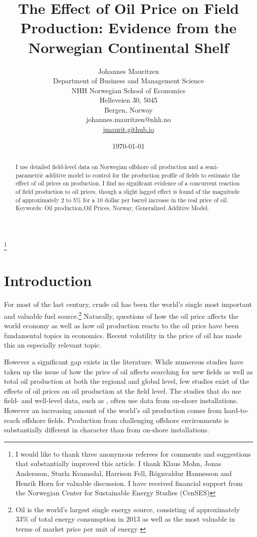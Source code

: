 \documentclass[11pt]{article}
\title{The Effect of Oil Price on Field Production: Evidence from the Norwegian Continental Shelf}
\author{Johannes Mauritzen\\
		Department of Business and Management Science\\
        NHH Norwegian School of Economics\\
        Helleveien 30, 5045\\
        Bergen, Norway\\
        johannes.mauritzen@nhh.no\\
        \url{jmaurit.github.io}\\
		}
\date{\today}
\begin{document}
 \begin{spacing}{1} %
	\maketitle

\begin{abstract}
I use detailed field-level data on Norwegian offshore oil production and a semi-parametric additive model to control for the production profile of fields to estimate the effect of oil prices on production.  I find no significant evidence of a concurrent reaction of field production to oil prices, though a slight lagged effect is found of the magnitude of approximately 2 to 5\% for a 10 dollar per barrel increase in the real price of oil.\\
Keywords: Oil production,Oil Prices, Norway, Generalized Additive Model.
\end{abstract}

\thanks{I would like to thank three anonymous referees for comments and suggestions that substantially improved this article. I thank Klaus Mohn, Jonas Andersson, Sturla Kvamsdal, Harrison Fell, R\"ognvaldur Hannesson and Henrik Horn for valuable discussion. I have received financial support from the Norwegian Center for Sustainable Energy Studies (CenSES)}
 \end{spacing}

\section{Introduction}

For most of the last century, crude oil has been the world's single most important and valuable fuel source.\footnote{Oil is the world's largest single energy source, consisting of approximately 33\% of total energy consumption in 2013 as well as the most valuable in terms of market price per unit of energy \citep{british_petroleum_statistical_2013}} Naturally, questions of how the oil price affects the world economy as well as how oil production reacts to the oil price have been fundamental topics in economics. Recent volatility in the price of oil has made this an especially relevant topic. 

However a significant gap exists in the literature.  While numerous studies have taken up the issue of how the price of oil affects searching for new fields as well as total oil production at both the regional and global level, few studies exist of the effects of oil prices on oil production at the field level.  The studies that do use field- and well-level data, such as \citet{rao_taxation_2010}, often use data from on-shore installations.  However an increasing amount of the world's oil production comes from hard-to-reach offshore fields.  Production from challenging offshore environments is substantially different in character than from on-shore installations.
\end{document}
